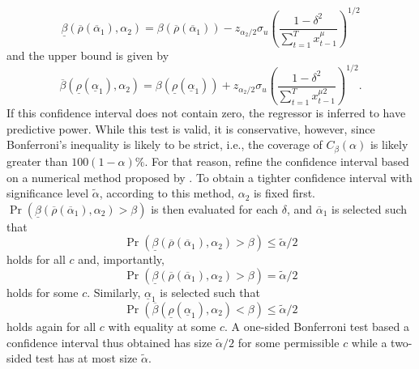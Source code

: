 \documentclass[11pt, a4paper]{article}
\begin{document}
\begin{equation}
\underline{\beta}\left(\overline{\rho}\left(\overline{\alpha}_{1}\right), \alpha_{2}\right)=\beta \left(\overline{\rho}\left(\overline{\alpha}_{1}\right) \right)-z_{\alpha_{2} / 2} \sigma_{u}\left(\frac{1-\delta^{2}}{\sum_{t=1}^{T} x_{t-1}^{\mu}}\right)^{1 / 2}
\end{equation}
and the upper bound is given by
\begin{equation}
\overline{\beta}\left(\underline{\rho}\left(\underline{\alpha}_{1}\right), \alpha_{2}\right)=\beta \left(\underline{\rho}\left(\underline{\alpha}_{1}\right) \right)+z_{\alpha_{2} / 2} \sigma_{u}\left(\frac{1-\delta^{2}}{\sum_{t=1}^{T} x_{t-1}^{\mu 2}}\right)^{1 / 2}.
\end{equation}
If this confidence interval does not contain zero, the regressor is inferred to have predictive power. While this test is valid, it is conservative, however, since Bonferroni's inequality is likely to be strict, i.e., the coverage of $C_{\beta}(\alpha)$ is likely greater than $100(1-\alpha) \%$. For that reason, \citet{campbell2006efficient} refine the confidence interval based on a numerical method proposed by \citet{cavaliere2005unit}. To obtain a tighter confidence interval with significance level $\widetilde{\alpha}$, according to this method, $\alpha_{2}$ is fixed first. $\operatorname{Pr}\left(\underline{\beta}\left(\overline{\rho}\left(\overline{\alpha}_{1}\right), \alpha_{2}\right)>\beta\right)$ is then evaluated for each $\delta$, and $\overline{\alpha}_{1}$ is selected such that 
\begin{equation}
\operatorname{Pr}\left(\underline{\beta}\left(\overline{\rho}\left(\overline{\alpha}_{1}\right),\alpha_{2}\right)>\beta\right) \leq \widetilde{\alpha} / 2\end{equation}
holds for all $c$ and, importantly,
\begin{equation}
\operatorname{Pr}\left(\underline{\beta}\left(\overline{\rho}\left(\overline{\alpha}_{1}\right), \alpha_{2}\right)>\beta\right) = \widetilde{\alpha} / 2
\end{equation}
holds for some $c$. 
Similarly, $\underline{\alpha}_{1}$ is selected such that 
\begin{equation}
\operatorname{Pr}\left(\overline{\beta}\left(\underline{\rho}\left(\underline{\alpha}_{1}\right), \alpha_{2}\right)<\beta\right) \leq \widetilde{\alpha} / 2
\end{equation}
holds again for all $c$ with equality at some $c$. A one-sided Bonferroni test based a confidence interval thus obtained has size $\widetilde{\alpha} / 2$ for some permissible $c$ while a two-sided test has at most size $\widetilde{\alpha}$.  
\end{document}

